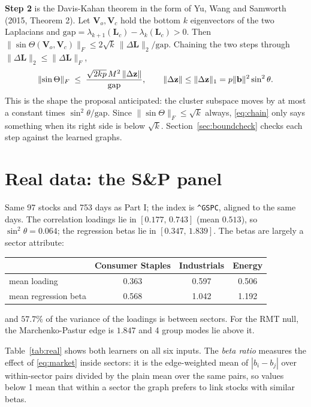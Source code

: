 \documentclass[11pt,a4paper]{article}
\newcommand{\Lap}{\mathbf{L}}
\newcommand{\Vmat}{\mathbf{V}}
\theoremstyle{remark}
\begin{document}
\textbf{Step 2} is the Davis-Kahan theorem in the form of Yu, Wang and Samworth (2015,
Theorem 2). Let $\Vmat_o,\Vmat_c$ hold the bottom $k$ eigenvectors of the two Laplacians
and $\mathrm{gap}=\lambda_{k+1}(\Lap_c)-\lambda_k(\Lap_c)>0$. Then
$\lVert\sin\Theta(\Vmat_o,\Vmat_c)\rVert_F\le2\sqrt k\,\lVert\Delta\Lap\rVert_2/\mathrm{gap}$.
Chaining the two steps through $\lVert\Delta\Lap\rVert_2\le\lVert\Delta\Lap\rVert_F$,
\begin{equation}\label{eq:chain}
  \lVert\sin\Theta\rVert_F\;\le\;\frac{\sqrt{2kp}\,M^2\,\lVert\Delta\mathbf z\rVert}{\mathrm{gap}},
  \qquad \lVert\Delta\mathbf z\rVert\le\lVert\Delta\mathbf z\rVert_1=p\lVert\mathbf b\rVert^2\sin^2\theta .
\end{equation}
This is the shape the proposal anticipated: the cluster subspace moves by at most a
constant times $\sin^2\theta/\mathrm{gap}$. Since $\lVert\sin\Theta\rVert_F\le\sqrt k$
always, \eqref{eq:chain} only says something when its right side is below $\sqrt k$.
Section~\ref{sec:boundcheck} checks each step against the learned graphs.

\section{Real data: the S\&P panel}\label{sec:real}

Same 97 stocks and 753 days as Part I; the index is \texttt{\^{}GSPC}, aligned to the
same days. The correlation loadings lie in $[0.177,\,0.743]$ (mean $0.513$), so
$\sin^2\theta=0.064$; the regression betas lie in $[0.347,\,1.839]$. The betas are
largely a sector attribute:

\begin{center}
\small
\begin{tabular}{lccc}
\toprule
 & Consumer Staples & Industrials & Energy \\
\midrule
mean loading & 0.363 & 0.597 & 0.506 \\
mean regression beta & 0.568 & 1.042 & 1.192 \\
\bottomrule
\end{tabular}
\end{center}
and $57.7\%$ of the variance of the loadings is between sectors. For the RMT null, the
Marchenko-Pastur edge is $1.847$ and 4 group modes lie above it.

Table~\ref{tab:real} shows both learners on all six inputs. The \emph{beta ratio}
measures the effect of \eqref{eq:market} inside sectors: it is the edge-weighted mean of
$|b_i-b_j|$ over within-sector pairs divided by the plain mean over the same pairs, so
values below 1 mean that within a sector the graph prefers to link stocks with similar
betas.
\end{document}

